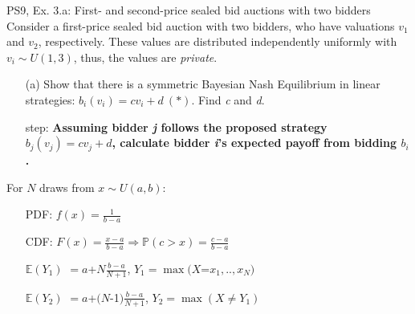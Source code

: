 \begin{frame}{PS9, Ex. 3.a: First- and second-price sealed bid auctions with two bidders}
    Consider a first-price sealed bid auction with two bidders, who have valuations $v_1$ and $v_2$, respectively. These values are distributed independently uniformly with $v_i\sim U(1,3)$, thus, the values are \textit{private}.
    \vspace{-4pt}
    \begin{itemize}
      \item[(a)] Show that there is a symmetric Bayesian Nash Equilibrium in linear strategies: $b_i(v_i) = cv_i + d\ (*)$. Find \textit{c} and \textit{d}.
    \end{itemize}
    \vspace{-8pt}
    \begin{multicols}{2}
      \begin{itemize}
        \item[\nth{1} step:] \textbf{Assuming bidder \textit{j} follows the proposed strategy $b_j(v_j) = cv_j + d$, calculate bidder \textit{i}'s expected payoff from bidding $b_i$.}
      \end{itemize}
      \vfill\null\columnbreak
      For $N$ draws from $x\sim U(a, b):$
      \vspace{-6pt}
      \begin{enumerate}
        \item[PDF:] $f(x)=\frac{1}{b-a}$
        \item[CDF:] $F(x)=\frac{x-a}{b-a}\Rightarrow\mathbb{P}(c>x)=\frac{c-a}{b-a}$
        \item[$\mathbb{E}(Y_1)$] $=a$+$N\frac{b-a}{N+1}$, $Y_1=\max(X$=$x_1,..,x_N)$
        \item[$\mathbb{E}(Y_2)$] $=a$+$(N$-1$)\frac{b-a}{N+1}$, $Y_2=\max(X\neq Y_1)$
      \end{enumerate}
      \vfill\null
    \end{multicols}
\end{frame}
